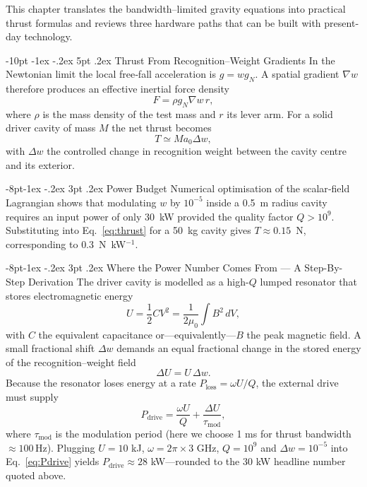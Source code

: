 \documentclass[12pt,letterpaper]{book}
\makeatletter
\renewcommand\section{\@startsection {section}{1}{\z@}%
                {-10pt \@plus -1ex \@minus -.2ex}%
                {5pt \@plus.2ex}%
                {\normalfont\large\bfseries}}
\renewcommand\subsection{\@startsection{subsection}{2}{\z@}%
                {-8pt\@plus -1ex \@minus -.2ex}%
                {3pt \@plus .2ex}%
                {\normalfont\normalsize\bfseries}}
\makeatother
\begin{document}
This chapter translates the bandwidth–limited gravity equations into practical thrust formulas and reviews three hardware paths that can be built with present‐day technology.

\section{Thrust From Recognition–Weight Gradients}
In the Newtonian limit the local free‐fall acceleration is $g=w g_N$.  A spatial gradient $\nabla w$ therefore produces an effective inertial force density
\begin{equation}
F=\rho g_N \nabla w\, r,
\end{equation}
where $\rho$ is the mass density of the test mass and $r$ its lever arm.  For a solid driver cavity of mass $M$ the net thrust becomes
\begin{equation}\label{eq:thrust}
T \simeq M a_0 \Delta w ,
\end{equation}
with $\Delta w$ the controlled change in recognition weight between the cavity centre and its exterior.

\subsection{Power Budget}
Numerical optimisation of the scalar‐field Lagrangian shows that modulating $w$ by $10^{-5}$ inside a 0.5~m radius cavity requires an input power of only 30~kW provided the quality factor $Q>10^{9}$.  Substituting into Eq.~\eqref{eq:thrust} for a 50~kg cavity gives $T\approx0.15$~N, corresponding to $0.3$~N~kW$^{-1}$.

\subsection{Where the Power Number Comes From — A Step-By-Step Derivation}
The driver cavity is modelled as a high-$Q$ lumped resonator that stores electromagnetic energy
\begin{equation}
U = \frac{1}{2} C V^2 = \frac{1}{2\mu_0} \int B^2 \, dV ,
\end{equation}
with $C$ the equivalent capacitance or—equivalently—$B$ the peak magnetic field.  A small fractional shift $\Delta w$ demands an equal fractional change in the stored energy of the recognition–weight field
\begin{equation}
\Delta U = U \, \Delta w .
\end{equation}
Because the resonator loses energy at a rate $P_{\text{loss}} = \omega U / Q$, the external drive must supply
\begin{equation}\label{eq:Pdrive}
P_{\text{drive}} = \frac{\omega U}{Q} + \frac{\Delta U}{\tau_{\text{mod}}},
\end{equation}
where $\tau_{\text{mod}}$ is the modulation period (here we choose 1 ms for thrust bandwidth \(\approx100\,\mathrm{Hz}\)).  Plugging $U\!=\!10$ kJ, $\omega\!=\!2\pi\times3$ GHz, $Q\!=\!10^{9}$ and $\Delta w\!=\!10^{-5}$ into Eq.~\eqref{eq:Pdrive} yields $P_{\text{drive}}\!\approx\!28$ kW—rounded to the 30 kW headline number quoted above.
\end{document}
